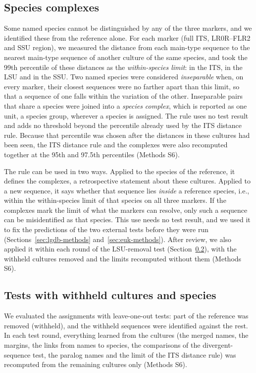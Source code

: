 \documentclass[11pt]{article}
\begin{document}
\subsection{Species complexes}\label{sec:complexes}
Some named species cannot be distinguished by any of the three markers, and we identified these from the reference
alone. For each marker (full ITS, LR0R--FLR2 and SSU region), we measured the distance from each main-type sequence
to the nearest main-type sequence of another culture of the same species, and took the 99th percentile of these
distances as the \emph{within-species limit}: \ITSSpread{} in the ITS, \LSUSpread{} in the LSU and \SSUSpread{} in
the SSU. Two named species were considered \emph{inseparable} when, on every marker, their closest sequences were no
farther apart than this limit, so that a sequence of one falls within the variation of the other. Inseparable pairs
that share a species were joined into a \emph{species complex}, which is reported as one unit, a species group,
wherever a species is assigned. The rule uses no test result and adds no threshold beyond the percentile already
used by the ITS distance rule. Because that percentile was chosen after the distances in these cultures had been
seen, the ITS distance rule and the complexes were also recomputed together at the 95th and 97.5th percentiles
(Methods S6).

The rule can be used in two ways. Applied to the species of the reference, it defines the complexes, a
retrospective statement about these cultures. Applied to a new sequence, it says whether that sequence lies
\emph{inside} a reference species, i.e., within the within-species limit of that species on all three markers. If
the complexes mark the limit of what the markers can resolve, only such a sequence can be misidentified as that
species. This use needs no test result, and we used it to fix the predictions of the two external tests before they
were run (Sections~\ref{sec:lgdb-methods} and~\ref{sec:euk-methods}). After review, we also applied it within each
round of the LSU-removal test (Section~\ref{sec:tests}), with the withheld cultures removed and the limits
recomputed without them (Methods S6).

\subsection{Tests with withheld cultures and species}\label{sec:tests}
We evaluated the assignments with leave-one-out tests: part of the reference was removed (withheld), and the
withheld sequences were identified against the rest. In each test round, everything learned from the cultures (the
merged names, the margins, the links from names to species, the comparisons of the divergent-sequence test, the
paralog names and the limit of the ITS distance rule) was recomputed from the remaining cultures only (Methods S6).
\end{document}
